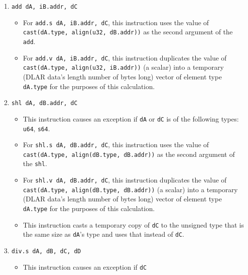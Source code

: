 \documentclass{article}
\begin{document}
\begin{itemize}
\begin{enumerate}
			\item \texttt{add dA, iB.addr, dC}
				\begin{itemize}
				\item For \texttt{add.s dA, iB.addr, dC}, this instruction
					uses the value of
					\texttt{cast(dA.type, align(u32, dB.addr))}
					as the second argument of the \texttt{add}.
				\item For \texttt{add.v dA, iB.addr, dC}, this instruction
					duplicates the value of
					\texttt{cast(dA.type, align(u32, iB.addr))}
					(a scalar) into a temporary (DLAR data's length number
					of bytes long) vector of element type \texttt{dA.type}
					for the purposes of this calculation.
				\end{itemize}
			\item \texttt{shl dA, dB.addr, dC}
				\begin{itemize}
				\item This instruction causes an exception if \texttt{dA}
					or \texttt{dC} is of the following types: \texttt{u64},
					\texttt{s64}.
				\item For \texttt{shl.s dA, dB.addr, dC}, this instruction
					uses the value of
					\texttt{cast(dA.type, align(dB.type, dB.addr))}
					as the second argument of the \texttt{shl}.
				\item For \texttt{shl.v dA, dB.addr, dC}, this instruction
					duplicates the value of
					\texttt{cast(dA.type, align(dB.type, dB.addr))}
					(a scalar) into a temporary (DLAR data's length number
					of bytes long) vector of element type \texttt{dA.type}
					for the purposes of this calculation.
				\item This instruction casts a temporary copy of
					\texttt{dC} to the unsigned type that is the same size
					as \texttt{dA}'s type and uses that instead of
					\texttt{dC}.
				\end{itemize}
			\item \texttt{div.s dA, dB, dC, dD}
				\begin{itemize}
				\item This instruction causes an exception if \texttt{dC}

\end{itemize}
\end{enumerate}
\end{itemize}
\end{document}
